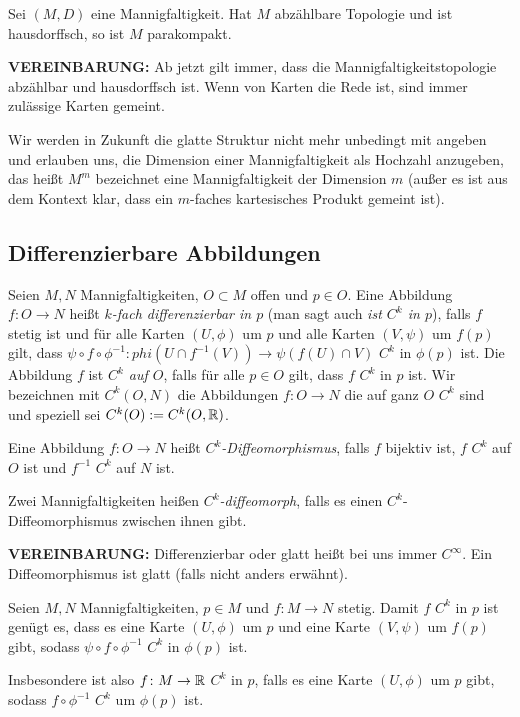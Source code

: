 \begin{proposition}
  Sei $(M,D)$ eine Mannigfaltigkeit. Hat $M$ abzählbare Topologie und
  ist hausdorffsch, so ist $M$ parakompakt.
\end{proposition}

\textbf{VEREINBARUNG:} Ab jetzt gilt immer, dass die
Mannigfaltigkeitstopologie abzählbar und hausdorffsch ist. Wenn von
Karten die Rede ist, sind immer zulässige Karten gemeint.

Wir werden in Zukunft die glatte Struktur nicht mehr unbedingt mit
angeben und erlauben uns, die Dimension einer Mannigfaltigkeit als
Hochzahl anzugeben, das heißt $M^m$ bezeichnet eine Mannigfaltigkeit
der Dimension $m$ (außer es ist aus dem Kontext klar, dass ein
$m$-faches kartesisches Produkt gemeint ist).

\subsection{Differenzierbare Abbildungen}
\label{sec:diffabb}

\begin{definition}
  Seien $M,N$ Mannigfaltigkeiten, $O\subset M$ offen und
  $p\in O$. Eine Abbildung $f\colon O \to N$
  heißt \emph{$k$-fach differenzierbar in $p$} (man sagt auch
  \emph{ist $C^k$ in $p$}), falls $f$ stetig ist und für alle Karten $(U,\phi)$ um $p$
  und alle Karten $(V,\psi)$ um $f(p)$ gilt, dass $\psi\circ
  f\circ\phi^{-1} \colon phi(U\cap f^{-1}(V)) \to \psi(f(U)\cap V)$
  $C^k$ in $\phi(p)$ ist. Die Abbildung $f$ ist
  \emph{$C^k$ auf $O$}, falls für alle $p\in O$ gilt, dass $f$ $C^k$
  in $p$ ist. Wir bezeichnen mit $C^k(O,N)$ die Abbildungen $f\colon O
  \to N$ die auf ganz $O$ $C^k$ sind und speziell sei $C^k(O) :=
  C^k(O,\mathbb{R})$. 

  Eine Abbildung $f\colon O\to N$ heißt \emph{$C^k$-Diffeomorphismus},
  falls $f$ bijektiv ist, $f$ $C^k$ auf $O$ ist und $f^{-1}$ $C^k$ auf
  $N$ ist.

  Zwei Mannigfaltigkeiten heißen \emph{$C^k$-diffeomorph}, falls es
  einen $C^k$-Diffeomorphismus zwischen ihnen gibt.
\end{definition}

\textbf{VEREINBARUNG:} Differenzierbar oder glatt heißt bei uns immer
$C^\infty$. Ein Diffeomorphismus ist glatt (falls nicht anders erwähnt).

\begin{proposition}
  Seien $M,N$ Mannigfaltigkeiten, $p\in M$ und $f\colon M \to
  N$ stetig. Damit $f$ $C^k$ in $p$ ist genügt es, dass es eine Karte
  $(U,\phi)$ um $p$ und eine Karte $(V,\psi)$ um $f(p)$ gibt, sodass
  $\psi\circ f\circ \phi^{-1}$ $C^k$ in $\phi(p)$ ist. 

  Insbesondere
  ist also $f\colon M \to \mathbb{R}$ $C^k$ in $p$, falls es eine Karte
  $(U,\phi)$ um $p$ gibt, sodass $f\circ \phi^{-1}$ $C^k$ um $\phi(p)$ ist.
\end{proposition}

